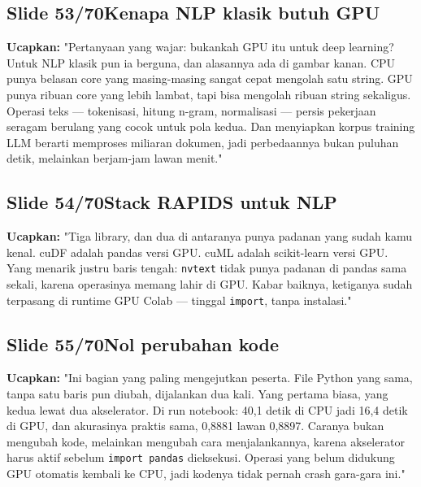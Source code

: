 \documentclass[11pt]{article}
\renewcommand{\framebox}[1]{\colorbox{acc!15}{\textcolor{acc}{\textbf{#1}}}}
\begin{document}
\subsection*{\framebox{Slide 53/70}\quad Kenapa NLP klasik butuh GPU}
\textbf{Ucapkan:} "Pertanyaan yang wajar: bukankah GPU itu untuk deep learning? Untuk NLP klasik pun ia berguna, dan alasannya ada di gambar kanan. CPU punya belasan core yang masing-masing sangat cepat mengolah satu string. GPU punya ribuan core yang lebih lambat, tapi bisa mengolah ribuan string sekaligus. Operasi teks — tokenisasi, hitung n-gram, normalisasi — persis pekerjaan seragam berulang yang cocok untuk pola kedua. Dan menyiapkan korpus training LLM berarti memproses miliaran dokumen, jadi perbedaannya bukan puluhan detik, melainkan berjam-jam lawan menit."\\[2pt]

\subsection*{\framebox{Slide 54/70}\quad Stack RAPIDS untuk NLP}
\textbf{Ucapkan:} "Tiga library, dan dua di antaranya punya padanan yang sudah kamu kenal. cuDF adalah pandas versi GPU. cuML adalah scikit-learn versi GPU. Yang menarik justru baris tengah: \texttt{nvtext} tidak punya padanan di pandas sama sekali, karena operasinya memang lahir di GPU. Kabar baiknya, ketiganya sudah terpasang di runtime GPU Colab — tinggal \texttt{import}, tanpa instalasi."\\[2pt]

\subsection*{\framebox{Slide 55/70}\quad Nol perubahan kode}
\textbf{Ucapkan:} "Ini bagian yang paling mengejutkan peserta. File Python yang sama, tanpa satu baris pun diubah, dijalankan dua kali. Yang pertama biasa, yang kedua lewat dua akselerator. Di run notebook: 40,1 detik di CPU jadi 16,4 detik di GPU, dan akurasinya praktis sama, 0,8881 lawan 0,8897. Caranya bukan mengubah kode, melainkan mengubah cara menjalankannya, karena akselerator harus aktif sebelum \texttt{import pandas} dieksekusi. Operasi yang belum didukung GPU otomatis kembali ke CPU, jadi kodenya tidak pernah crash gara-gara ini."\\[2pt]
\end{document}
